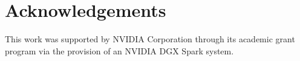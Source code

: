 \documentclass[conference]{IEEEtran}
\begin{document}
\section*{Acknowledgements}

This work was supported by NVIDIA Corporation through its academic grant
program via the provision of an NVIDIA DGX Spark system.



\end{document}
